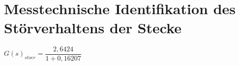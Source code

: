 
\newpage
[Perkowski]\\
\section{Messtechnische Identifikation des Störverhaltens der Stecke}

$ G(s)_{stoer} = \dfrac{2,6424}{1 + 0,16207} $